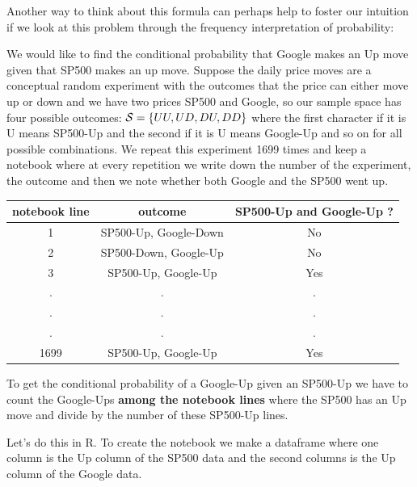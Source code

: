 \documentclass[
]{book}
\newenvironment{Shaded}{\begin{snugshade}}{\end{snugshade}}
\newcommand{\AttributeTok}[1]{\textcolor[rgb]{0.77,0.63,0.00}{#1}}
\newcommand{\FunctionTok}[1]{\textcolor[rgb]{0.00,0.00,0.00}{#1}}
\newcommand{\NormalTok}[1]{#1}
\newcommand{\OtherTok}[1]{\textcolor[rgb]{0.56,0.35,0.01}{#1}}
\newcommand{\SpecialCharTok}[1]{\textcolor[rgb]{0.00,0.00,0.00}{#1}}
\begin{document}
Another way to think about this formula can perhaps help to foster our intuition if we
look at this problem through the frequency interpretation of probability:

We would like to
find the conditional probability that Google makes an Up move given that
SP500 makes an up move. Suppose the daily price moves are a conceptual
random experiment with the outcomes that the
price can either move up or down and we have two prices SP500 and Google, so our
sample space has four possible outcomes:
\({\cal S} = \{ UU, UD, DU, DD \}\) where the first character if it is U means SP500-Up
and the second if it is U means Google-Up and so on for all possible combinations.
We repeat this
experiment 1699 times and keep a notebook where at every repetition we write down the
number of the experiment, the outcome and then we note whether both Google and the SP500
went up.

\begin{longtable}[]{@{}ccc@{}}
\toprule
notebook line & outcome & SP500-Up and Google-Up ? \\
\midrule
\endhead
1 & SP500-Up, Google-Down & No \\
2 & SP500-Down, Google-Up & No \\
3 & SP500-Up, Google-Up & Yes \\
. & . & . \\
. & . & . \\
. & . & . \\
1699 & SP500-Up, Google-Up & Yes \\
\bottomrule
\end{longtable}

To get the conditional probability of a Google-Up given an SP500-Up we have to count
the Google-Ups \textbf{among the notebook lines} where the SP500 has an Up move and divide by
the number of these SP500-Up lines.

Let's do this in R. To create the notebook we make a dataframe where one column is the Up column
of the SP500 data and the second columns is the Up column of the Google data.

\begin{Shaded}
\end{Shaded}
\end{document}
